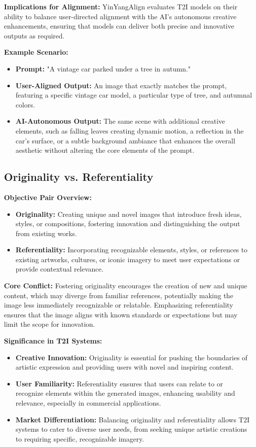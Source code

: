 \textbf{Implications for Alignment:}
YinYangAlign evaluates T2I models on their ability to balance user-directed alignment with the AI's autonomous creative enhancements, ensuring that models can deliver both precise and innovative outputs as required.

\textbf{Example Scenario:}
\begin{itemize}
    \item \textbf{Prompt:} "A vintage car parked under a tree in autumn."
    \item \textbf{User-Aligned Output:} An image that exactly matches the prompt, featuring a specific vintage car model, a particular type of tree, and autumnal colors.
    \item \textbf{AI-Autonomous Output:} The same scene with additional creative elements, such as falling leaves creating dynamic motion, a reflection in the car's surface, or a subtle background ambiance that enhances the overall aesthetic without altering the core elements of the prompt.
\end{itemize}

\subsection{Originality vs. Referentiality}

\textbf{Objective Pair Overview:}
\begin{itemize}
    \item \textbf{Originality:} Creating unique and novel images that introduce fresh ideas, styles, or compositions, fostering innovation and distinguishing the output from existing works.
    \item \textbf{Referentiality:} Incorporating recognizable elements, styles, or references to existing artworks, cultures, or iconic imagery to meet user expectations or provide contextual relevance.
\end{itemize}

\textbf{Core Conflict:}
Fostering originality encourages the creation of new and unique content, which may diverge from familiar references, potentially making the image less immediately recognizable or relatable. Emphasizing referentiality ensures that the image aligns with known standards or expectations but may limit the scope for innovation.

\textbf{Significance in T2I Systems:}
\begin{itemize}
    \item \textbf{Creative Innovation:} Originality is essential for pushing the boundaries of artistic expression and providing users with novel and inspiring content.
    \item \textbf{User Familiarity:} Referentiality ensures that users can relate to or recognize elements within the generated images, enhancing usability and relevance, especially in commercial applications.
    \item \textbf{Market Differentiation:} Balancing originality and referentiality allows T2I systems to cater to diverse user needs, from seeking unique artistic creations to requiring specific, recognizable imagery.
\end{itemize}

